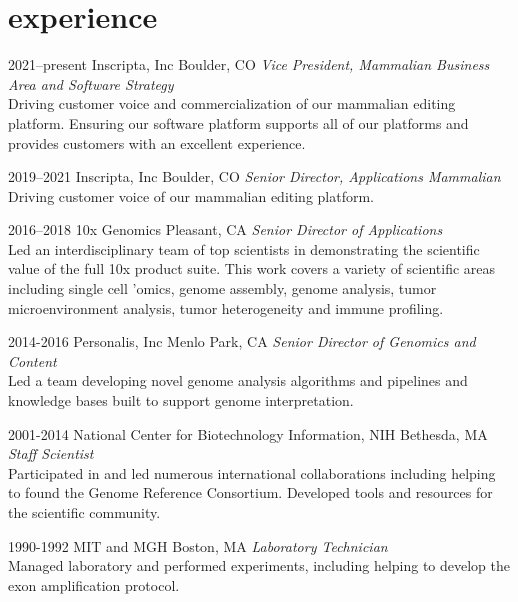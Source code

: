 \documentclass[]{dmc-cv} %
\begin{document}

\section{experience}

\begin{entrylist}

\entry
{2021--present}
{Inscripta, Inc}
{Boulder, CO}
{\emph{Vice President, Mammalian Business Area and Software Strategy}\\
Driving customer voice and commercialization of our mammalian editing platform. Ensuring our software platform supports all of our platforms and provides customers with an excellent experience.
}

\entry
{2019--2021}
{Inscripta, Inc}
{Boulder, CO}
{\emph{Senior Director, Applications Mammalian}\\
Driving customer voice of our mammalian editing platform.
}

\entry
{2016--2018}
{10x Genomics}
{Pleasant, CA}
{\emph{Senior Director of Applications} \\
Led an interdisciplinary team of top scientists in demonstrating the scientific value of the full
10x product suite. This work covers a variety of scientific areas including single cell 'omics, genome assembly, genome analysis,
tumor microenvironment analysis, tumor heterogeneity and immune profiling.
}

\entry
{2014-2016}
{Personalis, Inc}
{Menlo Park, CA}
{\emph{Senior Director of Genomics and Content} \\
Led a team developing novel genome analysis algorithms and pipelines and knowledge bases built to support genome interpretation.
}

\entry
{2001-2014}
{National Center for Biotechnology Information, NIH}
{Bethesda, MA}
{\emph{Staff Scientist} \\
Participated in and led numerous international collaborations including helping to found the Genome Reference Consortium. Developed tools and resources for the scientific community.
}

\entry
{1990-1992}
{MIT and MGH}
{Boston, MA}
{\emph{Laboratory Technician}\\
Managed laboratory and performed experiments, including helping to develop the exon amplification protocol.
}

\end{entrylist}
\end{document}

